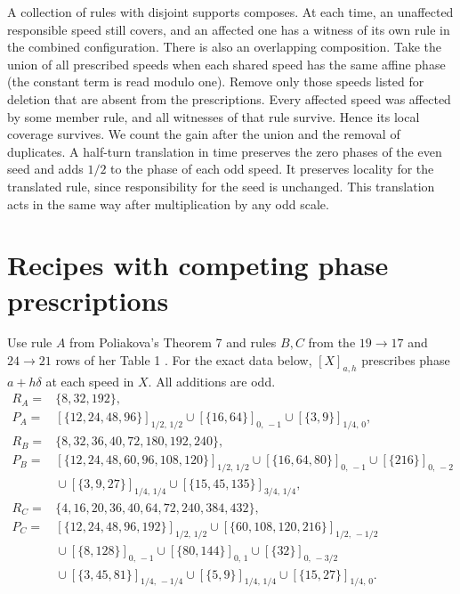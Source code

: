 \documentclass[11pt]{article}
\theoremstyle{definition}
\begin{document}
A collection of rules with disjoint supports composes. At each time,
an unaffected responsible speed still covers, and an affected one has a
witness of its own rule in the combined configuration.
There is also an overlapping composition. Take the union of all prescribed
speeds when each shared speed has the same affine phase (the constant term
is read modulo one). Remove only those speeds listed for deletion that
are absent from the prescriptions. Every affected speed was affected by
some member rule, and all witnesses of that rule survive. Hence its local
coverage survives. We count the gain after the union and the removal
of duplicates. A half-turn translation in time preserves the zero
phases of the even seed and adds \(1/2\) to the phase of each odd speed.
It preserves locality for the translated rule, since responsibility for
the seed is unchanged. This translation acts in the same way after
multiplication by any odd scale.

\section{Recipes with competing phase prescriptions}\label{sec:recipes}

Use rule \(A\) from Poliakova's Theorem 7 and rules \(B,C\) from the
\(19\to17\) and \(24\to21\) rows of her Table 1 \cite{Poliakova}.
For the exact data below, \([X]_{a,h}\) prescribes phase
\(a+h\delta\) at each speed in \(X\). All additions are odd.
\begin{align*}
 R_A={}&\{8,32,192\},\\
 P_A={}&[\{12,24,48,96\}]_{1/2,\,1/2}
       \cup[\{16,64\}]_{0,\,-1}\cup[\{3,9\}]_{1/4,\,0},\\[2pt]
 R_B={}&\{8,32,36,40,72,180,192,240\},\\
 P_B={}&[\{12,24,48,60,96,108,120\}]_{1/2,\,1/2}
       \cup[\{16,64,80\}]_{0,\,-1}\cup[\{216\}]_{0,\,-2}\\
     &{}\cup[\{3,9,27\}]_{1/4,\,1/4}
       \cup[\{15,45,135\}]_{3/4,\,1/4},\\[2pt]
 R_C={}&\{4,16,20,36,40,64,72,240,384,432\},\\
 P_C={}&[\{12,24,48,96,192\}]_{1/2,\,1/2}
       \cup[\{60,108,120,216\}]_{1/2,\,-1/2}\\
     &{}\cup[\{8,128\}]_{0,\,-1}\cup[\{80,144\}]_{0,\,1}
        \cup[\{32\}]_{0,\,-3/2}\\
     &{}\cup[\{3,45,81\}]_{1/4,\,-1/4}
        \cup[\{5,9\}]_{1/4,\,1/4}
        \cup[\{15,27\}]_{1/4,\,0}.
\end{align*}
\end{document}
